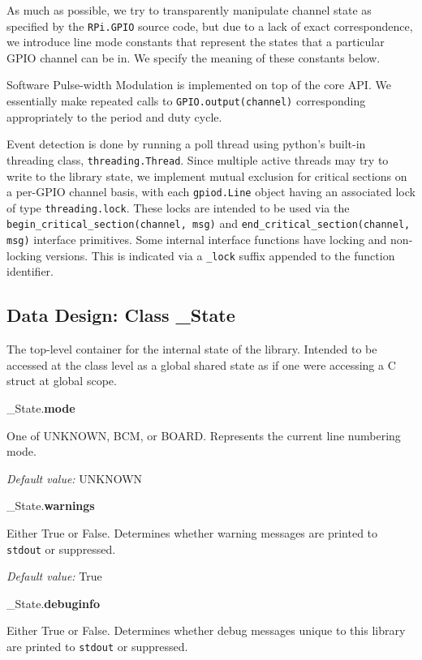 \documentclass[12pt]{article}
\begin{document}
As much as possible, we try to transparently manipulate channel state as specified by the \texttt{RPi.GPIO} source code, but due to a lack of exact correspondence, we introduce line mode constants that represent the states that a particular GPIO channel can be in. We specify the meaning of these constants below.

Software Pulse-width Modulation is implemented on top of the core API.
We essentially make repeated calls to \texttt{GPIO.output(channel)} corresponding appropriately to the period and duty cycle.

Event detection is done by running a poll thread using python's
built-in threading class, \texttt{threading.Thread}.
Since multiple active threads may try to write to the library state,
we implement mutual exclusion for critical sections on a per-GPIO channel basis,
with each \texttt{gpiod.Line} object having an associated lock of type
\texttt{threading.lock}. These locks are intended to be used via
the \texttt{begin\_critical\_section(channel, msg)} and
\sloppy
\texttt{end\_critical\_section(channel, msg)} interface
primitives. Some internal interface functions have locking and non-locking versions.
This is indicated via a \texttt{\_lock} suffix appended to the function identifier.

\subsection{Data Design: Class \_State} \label{class_state}

The top-level container for the internal state of the library. Intended to be accessed at the class level as a global shared state as if one were accessing a C struct at global scope. 

\medskip

\noindent \_State.\textbf{mode}

One of UNKNOWN, BCM, or BOARD. Represents the current line numbering mode.

\textit{Default value:} UNKNOWN

\noindent \_State.\textbf{warnings}

Either True or False. Determines whether warning messages are printed to \texttt{stdout} or suppressed.

\textit{Default value:} True

\noindent \_State.\textbf{debuginfo}

Either True or False. Determines whether debug messages unique to this library are printed to \texttt{stdout} or suppressed.
\end{document}
